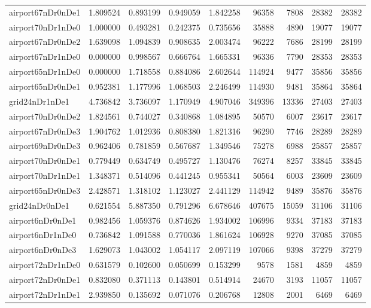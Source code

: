 \begin{longtable}{|l|r|r|r|r|r|r|r|r|}
airport67nDr0nDe1 & 1.809524 & 0.893199 & 0.949059 & 1.842258 & 96358 & 7808 & 28382 & 28382 \\
airport70nDr1nDe0 & 1.000000 & 0.493281 & 0.242375 & 0.735656 & 35888 & 4890 & 19077 & 19077 \\
airport67nDr0nDe2 & 1.639098 & 1.094839 & 0.908635 & 2.003474 & 96222 & 7686 & 28199 & 28199 \\
airport67nDr1nDe0 & 0.000000 & 0.998567 & 0.666764 & 1.665331 & 96336 & 7790 & 28353 & 28353 \\
airport65nDr1nDe0 & 0.000000 & 1.718558 & 0.884086 & 2.602644 & 114924 & 9477 & 35856 & 35856 \\
airport65nDr0nDe1 & 0.952381 & 1.177996 & 1.068503 & 2.246499 & 114930 & 9481 & 35864 & 35864 \\
grid24nDr1nDe1 & 4.736842 & 3.736097 & 1.170949 & 4.907046 & 349396 & 13336 & 27403 & 27403 \\
airport70nDr0nDe2 & 1.824561 & 0.744027 & 0.340868 & 1.084895 & 50570 & 6007 & 23617 & 23617 \\
airport67nDr0nDe3 & 1.904762 & 1.012936 & 0.808380 & 1.821316 & 96290 & 7746 & 28289 & 28289 \\
airport69nDr0nDe3 & 0.962406 & 0.781859 & 0.567687 & 1.349546 & 75278 & 6988 & 25857 & 25857 \\
airport70nDr0nDe1 & 0.779449 & 0.634749 & 0.495727 & 1.130476 & 76274 & 8257 & 33845 & 33845 \\
airport70nDr1nDe1 & 1.348371 & 0.514096 & 0.441245 & 0.955341 & 50564 & 6003 & 23609 & 23609 \\
airport65nDr0nDe3 & 2.428571 & 1.318102 & 1.123027 & 2.441129 & 114942 & 9489 & 35876 & 35876 \\
grid24nDr0nDe1 & 0.621554 & 5.887350 & 0.791296 & 6.678646 & 407675 & 15059 & 31106 & 31106 \\
airport6nDr0nDe1 & 0.982456 & 1.059376 & 0.874626 & 1.934002 & 106996 & 9334 & 37183 & 37183 \\
airport6nDr1nDe0 & 0.736842 & 1.091588 & 0.770036 & 1.861624 & 106928 & 9270 & 37085 & 37085 \\
airport6nDr0nDe3 & 1.629073 & 1.043002 & 1.054117 & 2.097119 & 107066 & 9398 & 37279 & 37279 \\
airport72nDr1nDe0 & 0.631579 & 0.102600 & 0.050699 & 0.153299 & 9578 & 1581 & 4859 & 4859 \\
airport72nDr0nDe1 & 0.832080 & 0.371113 & 0.143801 & 0.514914 & 24670 & 3193 & 11057 & 11057 \\
airport72nDr1nDe1 & 2.939850 & 0.135692 & 0.071076 & 0.206768 & 12808 & 2001 & 6469 & 6469 \\

\end{longtable}
